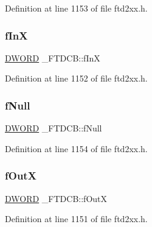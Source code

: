 Definition at line 1153 of file ftd2xx.\+h.

\mbox{\label{struct__FTDCB_a478569c6c3f26180e3f6326f7d123959}} 
\subsubsection{\texorpdfstring{f\+InX}{fInX}}
{\footnotesize\ttfamily \hyperlink{CatCaloProto40MHz_2inc_2WinTypes_8h_ad342ac907eb044443153a22f964bf0af}{D\+W\+O\+RD} \+\_\+\+F\+T\+D\+C\+B\+::f\+InX}



Definition at line 1152 of file ftd2xx.\+h.

\mbox{\label{struct__FTDCB_a96cdd935996bf8ebdfc841db6a526159}} 
\subsubsection{\texorpdfstring{f\+Null}{fNull}}
{\footnotesize\ttfamily \hyperlink{CatCaloProto40MHz_2inc_2WinTypes_8h_ad342ac907eb044443153a22f964bf0af}{D\+W\+O\+RD} \+\_\+\+F\+T\+D\+C\+B\+::f\+Null}



Definition at line 1154 of file ftd2xx.\+h.

\mbox{\label{struct__FTDCB_ad69a6d309c4e2f95588179e818a87c9d}} 
\subsubsection{\texorpdfstring{f\+OutX}{fOutX}}
{\footnotesize\ttfamily \hyperlink{CatCaloProto40MHz_2inc_2WinTypes_8h_ad342ac907eb044443153a22f964bf0af}{D\+W\+O\+RD} \+\_\+\+F\+T\+D\+C\+B\+::f\+OutX}



Definition at line 1151 of file ftd2xx.\+h.

\mbox{\label{struct__FTDCB_a3e5166713d0405820849e27ba554ba7d}} 
